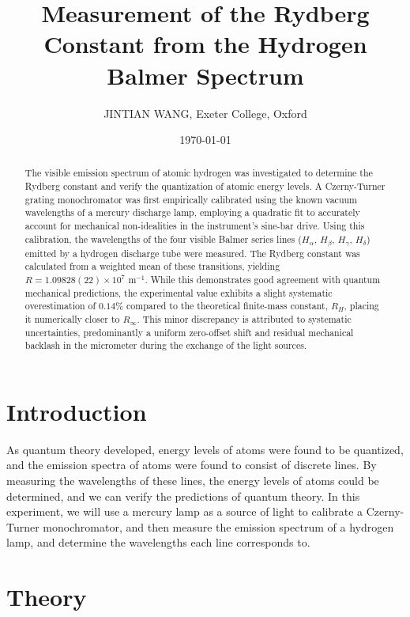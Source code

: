 \documentclass[12pt]{article}
\begin{document}
\title{Measurement of the Rydberg Constant from the Hydrogen Balmer Spectrum} 
\author{JINTIAN WANG, Exeter College, Oxford} 

\date{\today}  
\maketitle 

\begin{abstract} 
The visible emission spectrum of atomic hydrogen was investigated to determine the Rydberg constant and verify the quantization of atomic energy levels. A Czerny-Turner grating monochromator was first empirically calibrated using the known vacuum wavelengths of a mercury discharge lamp, employing a quadratic fit to accurately account for mechanical non-idealities in the instrument's sine-bar drive. Using this calibration, the wavelengths of the four visible Balmer series lines ($H_\alpha$, $H_\beta$, $H_\gamma$, $H_\delta$) emitted by a hydrogen discharge tube were measured. The Rydberg constant was calculated from a weighted mean of these transitions, yielding $R = 1.09828(22) \times 10^7 \text{ m}^{-1}$. While this demonstrates good agreement with quantum mechanical predictions, the experimental value exhibits a slight systematic overestimation of $0.14\%$ compared to the theoretical finite-mass constant, $R_H$, placing it numerically closer to $R_\infty$. This minor discrepancy is attributed to systematic uncertainties, predominantly a uniform zero-offset shift and residual mechanical backlash in the micrometer during the exchange of the light sources.\end{abstract}

\section{Introduction}

As quantum theory developed, energy levels of atoms were found to be quantized, and the emission spectra of atoms were found to consist of discrete lines. By measuring the wavelengths of these lines, the energy levels of atoms could be determined, and we can verify the predictions of quantum theory. In this experiment, we will use a mercury lamp as a source of light to calibrate a Czerny-Turner monochromator, and then measure the emission spectrum of a hydrogen lamp, and determine the wavelengths each line corresponds to.

\section{Theory}
\end{document}

